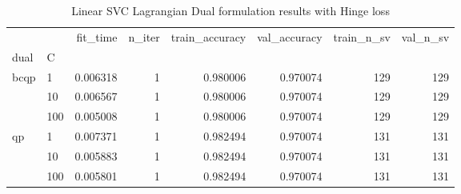 \begin{table}[h!]
\centering
\caption{Linear SVC Lagrangian Dual formulation results with Hinge loss}
\label{linear_lagrangian_dual_svc_cv_results}
\begin{tabular}{llrrrrrr}
\toprule
   &     &  fit\_time &  n\_iter &  train\_accuracy &  val\_accuracy &  train\_n\_sv &  val\_n\_sv \\
dual & C &           &         &                 &               &             &           \\
\midrule
bcqp & 1   &  0.006318 &       1 &        0.980006 &      0.970074 &         129 &       129 \\
   & 10  &  0.006567 &       1 &        0.980006 &      0.970074 &         129 &       129 \\
   & 100 &  0.005008 &       1 &        0.980006 &      0.970074 &         129 &       129 \\
qp & 1   &  0.007371 &       1 &        0.982494 &      0.970074 &         131 &       131 \\
   & 10  &  0.005883 &       1 &        0.982494 &      0.970074 &         131 &       131 \\
   & 100 &  0.005801 &       1 &        0.982494 &      0.970074 &         131 &       131 \\
\bottomrule
\end{tabular}
\end{table}
